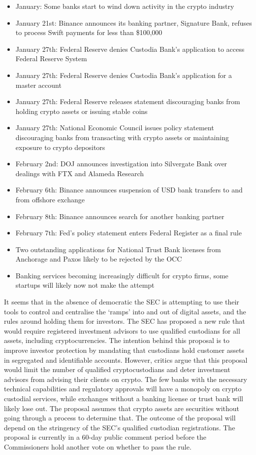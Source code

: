 \begin{itemize}
\item January: Some banks start to wind down activity in the crypto industry
\item January 21st: Binance announces its banking partner, Signature Bank, refuses to process Swift payments for less than \$100,000
\item January 27th: Federal Reserve denies Custodia Bank's application to access Federal Reserve System
\item January 27th: Federal Reserve denies Custodia Bank's application for a master account
\item January 27th: Federal Reserve releases statement discouraging banks from holding crypto assets or issuing stable coins
\item January 27th: National Economic Council issues policy statement discouraging banks from transacting with crypto assets or maintaining exposure to crypto depositors
\item February 2nd: DOJ announces investigation into Silvergate Bank over dealings with FTX and Alameda Research
\item February 6th: Binance announces suspension of USD bank transfers to and from offshore exchange
\item February 8th: Binance announces search for another banking partner
\item February 7th: Fed's policy statement enters Federal Register as a final rule
\item Two outstanding applications for National Trust Bank licenses from Anchorage and Paxos likely to be rejected by the OCC
\item Banking services becoming increasingly difficult for crypto firms, some startups will likely now not make the attempt
\end{itemize}
It seems that in the absence of democratic the SEC is attempting to use their tools to control and centralise the `ramps' into and out of digital assets, and the rules around holding them for investors. The SEC has proposed a new rule that would require registered investment advisors to use qualified custodians for all assets, including cryptocurrencies. The intention behind this proposal is to improve investor protection by mandating that custodians hold customer assets in segregated and identifiable accounts. However, critics argue that this proposal would limit the number of qualified cryptocustodians and deter investment advisors from advising their clients on crypto. The few banks with the necessary technical capabilities and regulatory approvals will have a monopoly on crypto custodial services, while exchanges without a banking license or trust bank will likely lose out. The proposal assumes that crypto assets are securities without going through a process to determine that. The outcome of the proposal will depend on the stringency of the SEC's qualified custodian registrations. The proposal is currently in a 60-day public comment period before the Commissioners hold another vote on whether to pass the rule.\par
